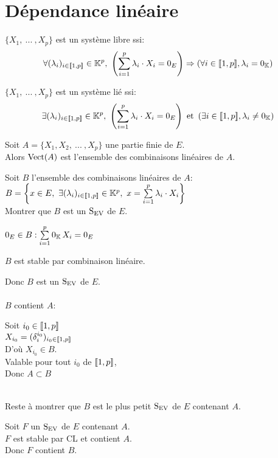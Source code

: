 \documentclass[12pt,twoside,a4paper]{article}
\begin{document}
	\section{Dépendance linéaire}
		\begin{defi}
			$\{X_1,\ ...\ ,X_p \}$ est un système libre ssi:
			$$\forall(\lambda_i)_{i\in\lbracket1,p\rbracket}\in\K^p,\ \left( \sum\limits_{i=1}^p\lambda_i\cdot X_i=0_E\right) \Rightarrow \left(  \forall i\in\lbracket1,p\rbracket, \lambda_i=0_\K\right) $$
		\end{defi}
		\begin{defi}
			$\{X_1,\ ...\ ,X_p \}$ est un système lié ssi:
			$$\exists(\lambda_i)_{i\in\lbracket1,p\rbracket}\in\K^p,\ \left( \sum\limits_{i=1}^p\lambda_i\cdot X_i=0_E\right) \et \left(  \exists i\in\lbracket1,p\rbracket, \lambda_i\neq 0_\K\right) $$
		\end{defi}
		\begin{prop}
			Soit $A=\{X_1,X_2,\ ...\ ,X_p \}$ une partie finie de $E$.\\
			Alors $\mathrm{Vect}(A)$ est l'ensemble des combinaisons linéaires de $A$.
		\end{prop}
		\begin{preuve}
			Soit $B$ l'ensemble des combinaisons linéaires de $A$:\\
			$B=\left\lbrace x\in E,\ \exists (\lambda_i)_{i\in\lbracket1,p\rbracket}\in\K^{p},\ x=\sum\limits_{i=1}^{p}\lambda_i \cdot X_i\right\rbrace $\\
			Montrer que $B$ est un $\mathrm{S}_\mathrm{EV}$ de $E$.
			\begin{liste}
				\item $0_E\in B: \sum\limits_{i=1}^p0_{\mathbb{K}}\,X_i=0_E$
				\item $B$ est stable par combinaison linéaire.
			\end{liste}
			Donc $B$ est un $\mathrm{S}_\mathrm{EV}$ de $E$.\\
			\\
			$B$ contient $A$:
			\begin{tab}
				Soit $i_0\in[\![1,p]\!]$\\
				$X_{i_0}=(\delta^{i_0}_i)_{i_0\in[\![1,p]\!]}$\\
				D'o\`u $X_{i_0}\in B$.\\
				Valable pour tout $i_0$ de $[\![1,p]\!]$,\\
				Donc $A\subset B$
			\end{tab}\ \\
			Reste \`a montrer que $B$ est le plus petit $\mathrm{S}_\mathrm{EV}$ de $E$ contenant $A$.
			\begin{tab}
				Soit $F$ un $\mathrm{S}_\mathrm{EV}$ de $E$ contenant $A$.\\
				$F$ est stable par CL et contient $A$.\\
				Donc $F$ contient $B$.
			\end{tab}
		\end{preuve}
\end{document}

